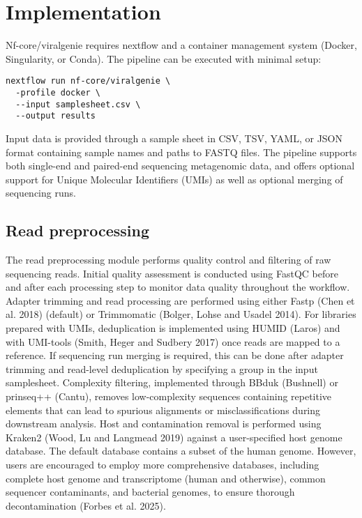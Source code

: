 \section{Implementation}

Nf-core/viralgenie requires nextflow and a container management system (Docker, Singularity, or Conda). The pipeline can be executed with minimal setup:

\begin{verbatim}
nextflow run nf-core/viralgenie \
  -profile docker \
  --input samplesheet.csv \
  --output results
\end{verbatim}

Input data is provided through a sample sheet in CSV, TSV, YAML, or JSON format containing sample names and paths to FASTQ files. The pipeline supports both single-end and paired-end sequencing metagenomic data, and offers optional support for Unique Molecular Identifiers (UMIs) as well as optional merging of sequencing runs.

\subsection{Read preprocessing}

The read preprocessing module performs quality control and filtering of raw sequencing reads. Initial quality assessment is conducted using FastQC before and after each processing step to monitor data quality throughout the workflow. Adapter trimming and read processing are performed using either Fastp (Chen et al. 2018) (default) or Trimmomatic (Bolger, Lohse and Usadel 2014). For libraries prepared with UMIs, deduplication is implemented using HUMID (Laros) and with UMI-tools (Smith, Heger and Sudbery 2017) once reads are mapped to a reference. If sequencing run merging is required, this can be done after adapter trimming and read-level deduplication by specifying a group in the input samplesheet. Complexity filtering, implemented through BBduk (Bushnell) or prinseq++ (Cantu), removes low-complexity sequences containing repetitive elements that can lead to spurious alignments or misclassifications during downstream analysis. Host and contamination removal is performed using Kraken2 (Wood, Lu and Langmead 2019) against a user-specified host genome database. The default database contains a subset of the human genome. However, users are encouraged to employ more comprehensive databases, including complete host genome and transcriptome (human and otherwise), common sequencer contaminants, and bacterial genomes, to ensure thorough decontamination (Forbes et al. 2025).

